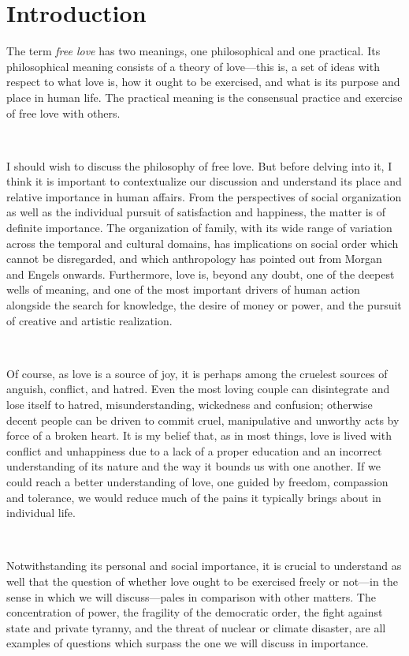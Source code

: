 \documentclass[a4paper, 12pt]{article}
\begin{document}
\section{Introduction}

The term \textit{free love} has two meanings, one philosophical and one
practical. Its philosophical meaning consists of a theory of
love---this is, a set of ideas with respect to what love is, how it ought to be
exercised, and what is its purpose and place in human life. 
The practical meaning is the consensual practice and exercise of free love with
others. 

~ 

I should wish to discuss the philosophy of free love. But before delving into
it, I think it is important to contextualize our discussion and understand its
place and relative importance in human affairs. From the perspectives of social
organization as well as the individual pursuit of satisfaction and happiness,
the matter is of definite importance. The organization of family, with its wide
range of variation across the temporal and cultural domains, has implications
on social order which cannot be disregarded, and which anthropology has pointed
out from Morgan and Engels onwards. Furthermore, love is, beyond any doubt, one
of the deepest wells of meaning, and one of the most important drivers of human
action alongside the search for knowledge, the desire of money or power, and
the pursuit of creative and artistic realization. 

~ 

Of course, as love is a source of joy, it is perhaps among the cruelest sources
of anguish, conflict, and hatred. Even the most loving couple can
disintegrate and lose itself to hatred, misunderstanding,
wickedness and confusion; otherwise decent people can be driven to commit
cruel, manipulative and unworthy acts by force of a broken heart. It is my
belief that, as in most things, love is lived with conflict and
unhappiness due to a lack of a proper education and an incorrect understanding
of its nature and the way it bounds us with one another. If we could reach a
better understanding of love, one guided by freedom, compassion and tolerance,
we would reduce much of the pains it typically brings about in individual life.

~

Notwithstanding its personal and social importance, it is crucial to understand
as well that the question of whether love ought to be exercised freely or
not---in the sense in which we will discuss---pales in comparison with other
matters. The concentration of power, the fragility of the democratic order, the
fight against state and private tyranny, and the threat of nuclear or climate
disaster, are all examples of questions which surpass the one we will discuss
in importance. 
\end{document}
